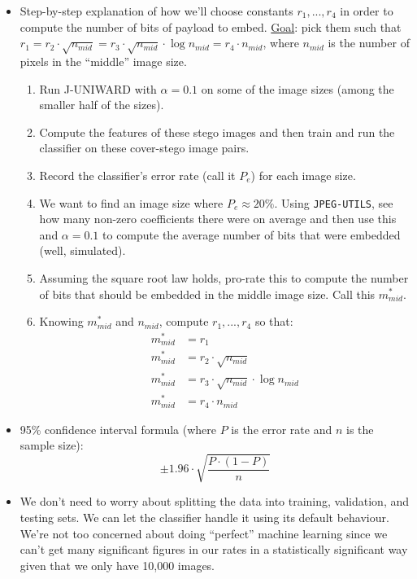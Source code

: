 \documentclass[11pt,a4paper]{report}
\begin{document}
\begin{itemize}
\item Step-by-step explanation of how we'll choose constants $r_1, ... , r_4$ in order to compute the number of bits of payload to embed. \underline{Goal}: pick them such that $r_1 = r_2 \cdot \sqrt{n_{mid}} = r_3 \cdot \sqrt{n_{mid}} \cdot \log n_{mid} = r_4 \cdot n_{mid}$, where $n_{mid}$ is the number of pixels in the ``middle'' image size.
  \begin{enumerate}
  \item Run J-UNIWARD with $\alpha = 0.1$ on some of the image sizes (among the smaller half of the sizes).
  \item Compute the features of these stego images and then train and run the classifier on these cover-stego image pairs.
  \item Record the classifier's error rate (call it $P_e$) for each image size.
  \item We want to find an image size where $P_e \approx 20\%$. Using \texttt{JPEG-UTILS}, see how many non-zero coefficients there were on average and then use this and $\alpha = 0.1$ to compute the average number of bits that were embedded (well, simulated).
  \item Assuming the square root law holds, pro-rate this to compute the number of bits that should be embedded in the middle image size. Call this $m^{\ast}_{mid}$.
  \item Knowing $m^{\ast}_{mid}$ and $n_{mid}$, compute $r_1, ... , r_4$ so that:
    \begin{align*}
    m^{\ast}_{mid} &= r_1 \\
    m^{\ast}_{mid} &= r_2 \cdot \sqrt{n_{mid}} \\
    m^{\ast}_{mid} &= r_3 \cdot \sqrt{n_{mid}} \cdot \log n_{mid} \\
    m^{\ast}_{mid} &= r_4 \cdot n_{mid}
    \end{align*}
  \end{enumerate}

\item 95\% confidence interval formula (where $P$ is the error rate and $n$ is the sample size):
  \begin{equation*}
  \pm 1.96 \cdot \sqrt{\frac{P \cdot (1-P)}{n}}
  \end{equation*}

\item We don't need to worry about splitting the data into training, validation, and testing sets. We can let the classifier handle it using its default behaviour. We're not too concerned about doing ``perfect'' machine learning since we can't get many significant figures in our rates in a statistically significant way given that we only have 10,000 images.

\end{itemize}
\end{document}

